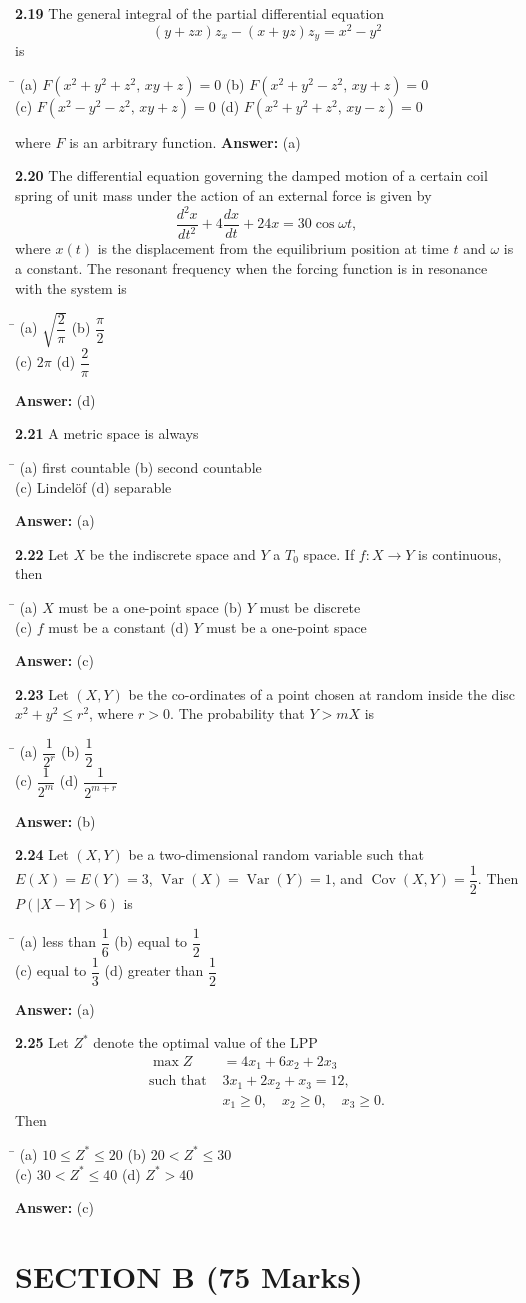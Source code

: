 \documentclass[11pt,a4paper]{article}
\newcommand{\optsfour}[4]{%
  \begin{tabbing}
    \hspace{0.48\linewidth}\=\kill
    (a) #1 \> (b) #2 \\[2pt]
    (c) #3 \> (d) #4
  \end{tabbing}%
}
\newcommand{\ans}[1]{\textbf{Answer:} #1\par\medskip}
\begin{document}
\textbf{2.19} The general integral of the partial differential equation
\[
  (y + zx)z_x - (x + yz)z_y = x^2 - y^2
\]
is
\optsfour{$F(x^2 + y^2 + z^2,\, xy + z) = 0$}{$F(x^2 + y^2 - z^2,\, xy + z) = 0$}{$F(x^2 - y^2 - z^2,\, xy + z) = 0$}{$F(x^2 + y^2 + z^2,\, xy - z) = 0$}
where $F$ is an arbitrary function.
\ans{(a)}

\textbf{2.20} The differential equation governing the damped motion of a certain coil spring of unit mass under the action of an external force is given by
\[
  \frac{d^2x}{dt^2} + 4\frac{dx}{dt} + 24x = 30\cos\omega t,
\]
where $x(t)$ is the displacement from the equilibrium position at time $t$ and $\omega$ is a constant. The resonant frequency when the forcing function is in resonance with the system is
\optsfour{$\sqrt{\dfrac{2}{\pi}}$}{$\dfrac{\pi}{2}$}{$2\pi$}{$\dfrac{2}{\pi}$}
\ans{(d)}

\textbf{2.21} A metric space is always
\optsfour{first countable}{second countable}{Lindel\"of}{separable}
\ans{(a)}

\textbf{2.22} Let $X$ be the indiscrete space and $Y$ a $T_0$ space. If $f : X \to Y$ is continuous, then
\optsfour{$X$ must be a one-point space}{$Y$ must be discrete}{$f$ must be a constant}{$Y$ must be a one-point space}
\ans{(c)}

\textbf{2.23} Let $(X, Y)$ be the co-ordinates of a point chosen at random inside the disc $x^2 + y^2 \le r^2$, where $r > 0$. The probability that $Y > mX$ is
\optsfour{$\dfrac{1}{2^r}$}{$\dfrac{1}{2}$}{$\dfrac{1}{2^m}$}{$\dfrac{1}{2^{m+r}}$}
\ans{(b)}

\textbf{2.24} Let $(X, Y)$ be a two-dimensional random variable such that $E(X) = E(Y) = 3$, $\operatorname{Var}(X) = \operatorname{Var}(Y) = 1$, and $\operatorname{Cov}(X, Y) = \dfrac{1}{2}$. Then $P(|X - Y| > 6)$ is
\optsfour{less than $\dfrac{1}{6}$}{equal to $\dfrac{1}{2}$}{equal to $\dfrac{1}{3}$}{greater than $\dfrac{1}{2}$}
\ans{(a)}

\textbf{2.25} Let $Z^*$ denote the optimal value of the LPP
\begin{align*}
  \max Z &= 4x_1 + 6x_2 + 2x_3 \\
  \text{such that } & 3x_1 + 2x_2 + x_3 = 12, \\
                    & x_1 \ge 0, \quad x_2 \ge 0, \quad x_3 \ge 0.
\end{align*}
Then
\optsfour{$10 \le Z^* \le 20$}{$20 < Z^* \le 30$}{$30 < Z^* \le 40$}{$Z^* > 40$}
\ans{(c)}

\section*{SECTION B (75 Marks)}
\end{document}
